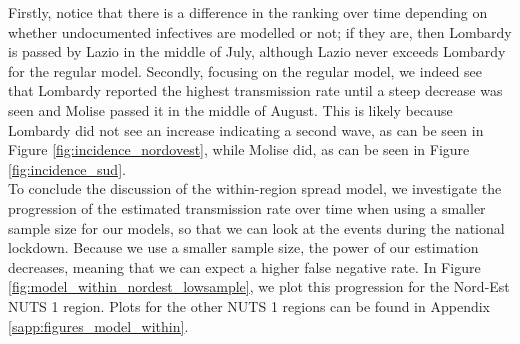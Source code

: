 \documentclass[12pt]{article}
\begin{document}
	Firstly, notice that there is a difference in the ranking over time depending on whether undocumented infectives are modelled or not; if they are, then Lombardy is passed by Lazio in the middle of July, although Lazio never exceeds Lombardy for the regular model. Secondly, focusing on the regular model, we indeed see that Lombardy reported the highest transmission rate until a steep decrease was seen and Molise passed it in the middle of August. This is likely because Lombardy did not see an increase indicating a second wave, as can be seen in Figure \ref{fig:incidence_nordovest}, while Molise did, as can be seen in Figure \ref{fig:incidence_sud}. \\
	
	To conclude the discussion of the within-region spread model, we investigate the progression of the estimated transmission rate over time when using a smaller sample size for our models, so that we can look at the events during the national lockdown. Because we use a smaller sample size, the power of our estimation decreases, meaning that we can expect a higher false negative rate. In Figure \ref{fig:model_within_nordest_lowsample}, we plot this progression for the Nord-Est NUTS 1 region. Plots for the other NUTS 1 regions can be found in Appendix \ref{sapp:figures_model_within}.
	
\end{document}
